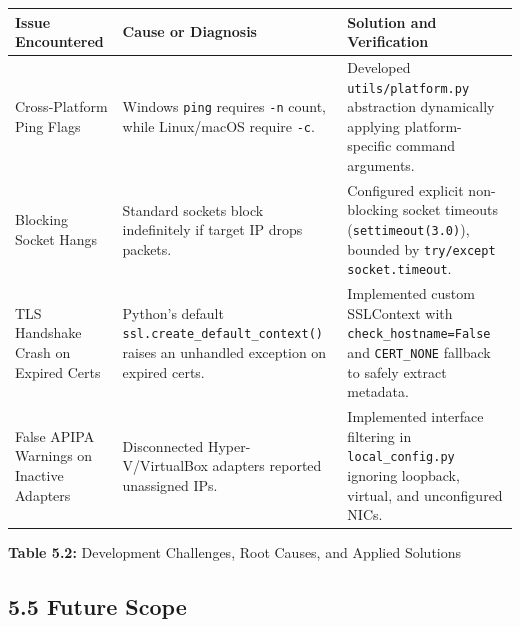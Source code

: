 \documentclass[
]{article}
\newcounter{none} %
\begin{document}
{\def\LTcaptype{none} %
\begin{longtable}[]{@{}
  >{\raggedright\arraybackslash}p{}
  >{\raggedright\arraybackslash}p{}
  >{\raggedright\arraybackslash}p{}@{}}
\toprule\noalign{}
\begin{minipage}[b]{\linewidth}\raggedright
\textbf{Issue Encountered}
\end{minipage} & \begin{minipage}[b]{\linewidth}\raggedright
\textbf{Cause or Diagnosis}
\end{minipage} & \begin{minipage}[b]{\linewidth}\raggedright
\textbf{Solution and Verification}
\end{minipage} \\
\midrule\noalign{}
\endhead
\bottomrule\noalign{}
\endlastfoot
Cross-Platform Ping Flags & Windows \texttt{ping} requires \texttt{-n} count, while Linux/macOS require \texttt{-c}. & Developed \texttt{utils/platform.py} abstraction dynamically applying platform-specific command arguments. \\
Blocking Socket Hangs & Standard sockets block indefinitely if target IP drops packets. & Configured explicit non-blocking socket timeouts (\texttt{settimeout(3.0)}), bounded by \texttt{try/except socket.timeout}. \\
TLS Handshake Crash on Expired Certs & Python's default \texttt{ssl.create\_default\_context()} raises an unhandled exception on expired certs. & Implemented custom SSLContext with \texttt{check\_hostname=False} and \texttt{CERT\_NONE} fallback to safely extract metadata. \\
False APIPA Warnings on Inactive Adapters & Disconnected Hyper-V/VirtualBox adapters reported unassigned IPs. & Implemented interface filtering in \texttt{local\_config.py} ignoring loopback, virtual, and unconfigured NICs. \\
\end{longtable}
}

\begin{center}
\textbf{Table 5.2:} Development Challenges, Root Causes, and Applied Solutions
\end{center}

\subsection{5.5 Future Scope}\label{future-scope}
\end{document}
